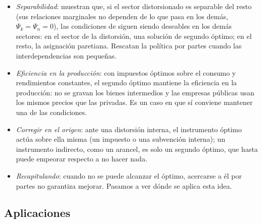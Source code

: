 \documentclass[11pt]{article}
\begin{document}
\begin{itemize}
\item \emph{Separabilidad}: \textcite{DavisWhinston1965Welfare} muestran que, si el sector distorsionado es separable del resto (sus relaciones marginales no dependen de lo que pasa en los demás, $\Psi_k=\Psi_n=0$), las condiciones de  siguen siendo deseables en los demás sectores: en el sector de la distorsión, una solución de segundo óptimo; en el resto, la asignación paretiana. Rescatan la política por partes cuando las interdependencias son pequeñas.
\item \emph{Eficiencia en la producción}: con impuestos óptimos sobre el consumo y rendimientos constantes, el segundo óptimo mantiene la eficiencia en la producción: no se gravan los bienes intermedios y las empresas públicas usan los mismos precios que las privadas\nocite{DiamondMirrlees1971Optimal}. Es un caso en que sí conviene mantener una de las condiciones.
\item \emph{Corregir en el origen}: ante una distorsión interna, el instrumento óptimo actúa sobre ella misma (un impuesto o una subvención interna); un instrumento indirecto, como un arancel, es solo un segundo óptimo, que hasta puede empeorar respecto a no hacer nada\nocite{BhagwatiRamaswami1963Domestic}.
\item \emph{Recapitulando}: cuando no se puede alcanzar el óptimo, acercarse a él por partes no garantiza mejorar. Pasamos a ver dónde se aplica esta idea.
\end{itemize}

\subsection{Aplicaciones}\label{sec:second-best-aplicaciones}
\end{document}
